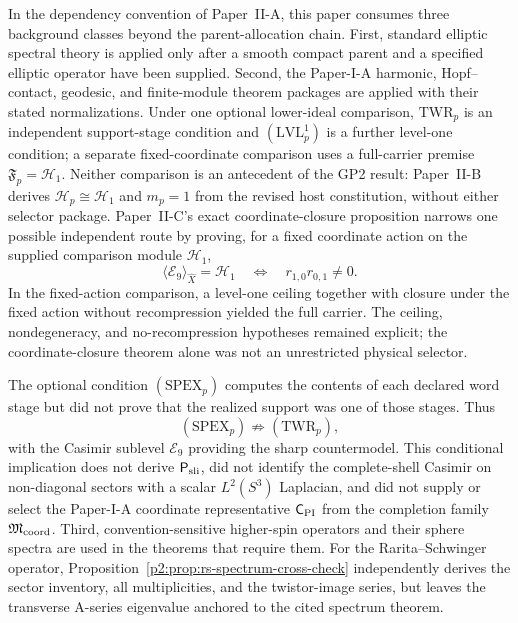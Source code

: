 \documentclass[11pt,a4paper]{article}
\begin{document}
\begin{remark}
In the dependency convention of Paper~II-A, this paper consumes three
background classes beyond the parent-allocation chain.  First, standard elliptic
spectral theory is applied only after a smooth compact parent and a specified
elliptic operator have been supplied.  Second, the Paper-I-A harmonic,
Hopf--contact, geodesic, and finite-module theorem packages are applied with
their stated normalizations.  Under one optional lower-ideal comparison, \(\mathrm{TWR}_p\) is
an independent support-stage condition and \((\mathrm{LVL}_p^1)\)
is a further level-one condition; a separate fixed-coordinate comparison
uses a full-carrier premise \(\mathfrak F_p=\mathcal H_1\).
Neither comparison is an antecedent of the GP2 result: Paper~II-B derives
\(\mathcal H_p\cong\mathcal H_1\) and \(m_p=1\) from the revised host
constitution, without either selector package.  Paper~II-C's exact coordinate-closure
proposition narrows one possible independent route by proving, for a fixed
coordinate action on the supplied comparison module \(\mathcal H_1\),
\[
 \langle\mathcal E_9\rangle_{\widehat X}=\mathcal H_1
 \quad\Longleftrightarrow\quad r_{1,0}r_{0,1}\ne0.
\]
In the fixed-action comparison, a level-one ceiling together with closure under the fixed
action without recompression yielded the full carrier.  The ceiling,
nondegeneracy, and no-recompression hypotheses remained explicit; the
coordinate-closure theorem alone was not an unrestricted physical selector.

The optional condition \((\mathrm{SPEX}_p)\) computes the contents of each
declared word stage but did not prove that the realized support was one of
those stages.
Thus
\[
   (\mathrm{SPEX}_p)\not\Longrightarrow(\mathrm{TWR}_p),
\]
with the Casimir sublevel \(\mathcal E_9\) providing the sharp countermodel.
This conditional implication does not derive
\(\mathsf P_{\rm sli}\), did not identify the complete-shell Casimir on
non-diagonal sectors with a scalar \(L^2(S^3)\) Laplacian, and did not supply
or select the Paper-I-A coordinate representative \(\mathsf C_{\rm PI}\) from
the completion family \(\mathfrak M_{\rm coord}\).  Third,
convention-sensitive higher-spin operators and
their sphere spectra are used in the theorems that require them.  For the
Rarita--Schwinger operator,
Proposition~\ref{p2:prop:rs-spectrum-cross-check} independently derives the
sector inventory, all multiplicities, and the twistor-image series, but leaves
the transverse A-series eigenvalue anchored to the cited spectrum theorem.
\end{remark}
\end{document}
